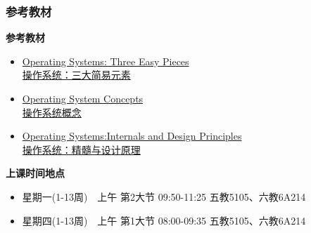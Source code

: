 \begin{frame}
	\frametitle{参考教材}
	
%		
			\textbf{参考教材}
			\begin{itemize}
				\item \href{http://www.ostep.org/}{Operating Systems: Three Easy Pieces \\ 操作系统：三大简易元素}
				\item \href{http://item.jd.com/10553956.html}{Operating System Concepts \\ 操作系统概念}
				\item \href{http://item.jd.com/10255221.html}{Operating Systems:Internals and Design Principles \\ 操作系统：精髓与设计原理}
			\end{itemize}
			\pause
		
			\textbf{上课时间地点}
			\begin{itemize}
				\item 星期一(1-13周)　上午 第2大节  09:50-11:25  五教5105、六教6A214
				\item 星期四(1-13周)　上午 第1大节  08:00-09:35  五教5105、六教6A214
		    \end{itemize}
%		
%			
%			
%		
	
\end{frame}

